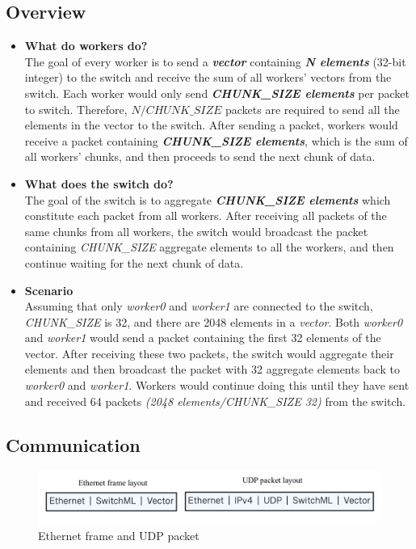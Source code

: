 \documentclass[a4paper,11pt]{article}
\begin{document}
\subsection{Overview}
\begin{itemize}
    \item \textbf{What do workers do?} \\
    The goal of every worker is to send a \textbf{\textit{vector}} containing \textit{\textbf{N elements}} (32-bit integer) to the switch and receive the sum of all workers' vectors from the switch. Each worker would only send \textit{\textbf{CHUNK\_SIZE elements}} per packet to switch. Therefore, \({N}/{CHUNK\_SIZE}\) packets are required to send all the elements in the vector to the switch. After sending a packet, workers would receive a packet containing \textit{\textbf{CHUNK\_SIZE elements}}, which is the sum of all workers' chunks, and then proceeds to send the next chunk of data.
    \item \textbf{What does the switch do?} \\
    The goal of the switch is to aggregate \textit{\textbf{CHUNK\_SIZE elements}} which constitute each packet from all workers. After receiving all packets of the same chunks from all workers, the switch would broadcast the packet containing \textit{CHUNK\_SIZE} aggregate elements to all the workers, and then continue waiting for the next chunk of data.
    \item \textbf{Scenario} \\
    Assuming that only \textit{worker0} and \textit{worker1} are connected to the switch, \textit{CHUNK\_SIZE} is 32, and there are 2048 elements in a \textit{vector}. Both \textit{worker0} and \textit{worker1} would send a packet containing the first 32 elements of the vector. After receiving these two packets, the switch would aggregate their elements and then broadcast the packet with 32 aggregate elements back to \textit{worker0} and \textit{worker1}. Workers would continue doing this until they have sent and received 64 packets \textit{(2048 elements/CHUNK\_SIZE 32)} from the switch.
\end{itemize}


\subsection{Communication}
\label{sec:communicate}
\begin{figure}[htbp]
    \centering
    \includegraphics[width=14cm]{header_layout.jpg}
    \caption{Ethernet frame and UDP packet}
    \label{fig:hdr}
\end{figure}
\end{document}
